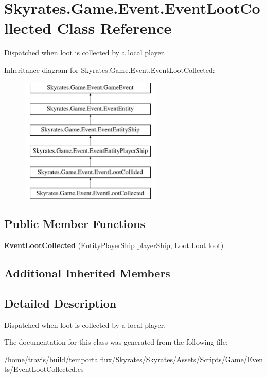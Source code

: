 \hypertarget{class_skyrates_1_1_game_1_1_event_1_1_event_loot_collected}{\section{Skyrates.\-Game.\-Event.\-Event\-Loot\-Collected Class Reference}
\label{class_skyrates_1_1_game_1_1_event_1_1_event_loot_collected}
}


Dispatched when loot is collected by a local player.  


Inheritance diagram for Skyrates.\-Game.\-Event.\-Event\-Loot\-Collected\-:\begin{figure}[H]
\begin{center}
\leavevmode
\includegraphics[height=6.000000cm]{class_skyrates_1_1_game_1_1_event_1_1_event_loot_collected}
\end{center}
\end{figure}
\subsection*{Public Member Functions}
\begin{DoxyCompactItemize}
\item 
\hypertarget{class_skyrates_1_1_game_1_1_event_1_1_event_loot_collected_a8914838e7729e447b7f4ba7ac7d93e14}{{\bfseries Event\-Loot\-Collected} (\hyperlink{class_skyrates_1_1_entity_1_1_entity_player_ship}{Entity\-Player\-Ship} player\-Ship, \hyperlink{class_skyrates_1_1_loot_1_1_loot}{Loot.\-Loot} loot)}\label{class_skyrates_1_1_game_1_1_event_1_1_event_loot_collected_a8914838e7729e447b7f4ba7ac7d93e14}

\end{DoxyCompactItemize}
\subsection*{Additional Inherited Members}


\subsection{Detailed Description}
Dispatched when loot is collected by a local player. 



The documentation for this class was generated from the following file\-:\begin{DoxyCompactItemize}
\item 
/home/travis/build/temportalflux/\-Skyrates/\-Skyrates/\-Assets/\-Scripts/\-Game/\-Events/Event\-Loot\-Collected.\-cs\end{DoxyCompactItemize}
